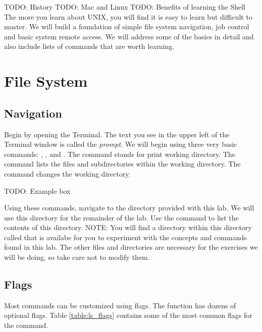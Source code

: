 \label{lab:Shell}


TODO: History
TODO: Mac and Linux
TODO: Benefits of learning the Shell
The more you learn about UNIX, you will find it is easy to learn but difficult to master. We will build a foundation of simple file system navigation, job control and basic system remote access. We will address some of the basics in detail and also include lists of commands that are worth learning.

\section*{File System}
\subsection*{Navigation}

Begin by opening the Terminal. The text you see in the upper left of the Terminal window is called the \emph{prompt}. We will begin using three very basic commands: , , and . The  command stands for print working directory. The  command lists the files and subdirectories within the working directory. The  command changes the working directory.

TODO: Example box


\begin{problem}
Using these commands, navigate to the  directory provided with this lab. We will use this directory for the remainder of the lab. Use the  command to list the contents of this directory. NOTE: You will find a directory within this directory called  that is availabe for you to experiment with the concepts and commands found in this lab. The other files and directories are necessary for the exercises we will be doing, so take care not to modify them.
\end{problem}

\subsection*{Flags}
Most commands can be customized using flags. The  function has dozens of optional flags. Table \ref{table:ls_flags} contains some of the most common flags for the  command.

